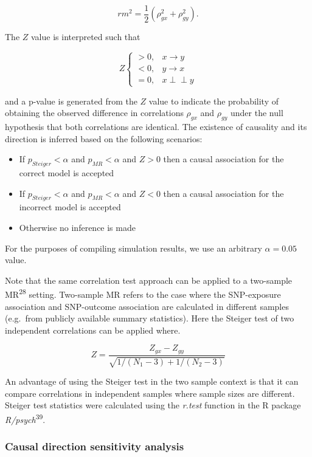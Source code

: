 \documentclass[]{article}
\providecommand{\tightlist}{%
  \setlength{\itemsep}{0pt}\setlength{\parskip}{0pt}}
\begin{document}
\[
rm^2 = \frac{1}{2}(\rho_{gx}^2 + \rho_{gy}^2).
\]

The \(Z\) value is interpreted such that

\[
Z \left\{
\begin{array}{ll}
> 0, & x \to y\\
< 0, & y \to x\\
= 0, & x \perp\!\!\!\perp y 
\end{array} \right.
\]

and a p-value is generated from the \(Z\) value to indicate the
probability of obtaining the observed difference in correlations
\(\rho_{gx}\) and \(\rho_{gy}\) under the null hypothesis that both
correlations are identical. The existence of causality and its direction
is inferred based on the following scenarios:

\begin{itemize}
\tightlist
\item
  If \(p_{Steiger} < \alpha\) and \(p_{MR} < \alpha\) and \(Z > 0\) then
  a causal association for the correct model is accepted
\item
  If \(p_{Steiger} < \alpha\) and \(p_{MR} < \alpha\) and \(Z < 0\) then
  a causal association for the incorrect model is accepted
\item
  Otherwise no inference is made
\end{itemize}

For the purposes of compiling simulation results, we use an arbitrary
\(\alpha = 0.05\) value.

Note that the same correlation test approach can be applied to a
two-sample MR\textsuperscript{28} setting. Two-sample MR refers to the
case where the SNP-exposure association and SNP-outcome association are
calculated in different samples (e.g.~from publicly available summary
statistics). Here the Steiger test of two independent correlations can
be applied where.

\[
Z = \frac{Z_{gx} - Z_{gy}} { \sqrt{ 1 / (N_{1} - 3) + 1 / (N_{2} - 3) } }
\]

An advantage of using the Steiger test in the two sample context is that
it can compare correlations in independent samples where sample sizes
are different. Steiger test statistics were calculated using the
\emph{r.test} function in the R package
\emph{R/psych}\textsuperscript{39}.

\subsubsection{Causal direction sensitivity
analysis}\label{causal-direction-sensitivity-analysis}
\end{document}
